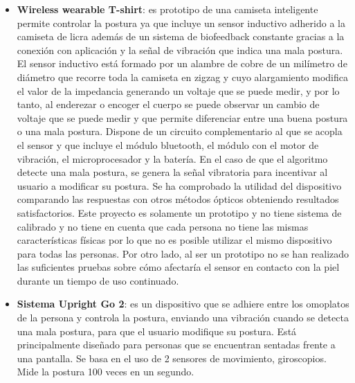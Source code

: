 \begin{itemize}
    \item \textbf{Wireless wearable T-shirt}\cite{wirelessT-shirt}: es prototipo de una camiseta inteligente permite controlar la postura ya que incluye un sensor inductivo adherido a la camiseta de licra además de un sistema de biofeedback constante gracias a la conexión con aplicación y la señal de vibración que indica una mala postura. El sensor inductivo está formado por un alambre de cobre de un milímetro de diámetro que recorre toda la camiseta en zigzag y cuyo alargamiento modifica el valor de la impedancia generando un voltaje que se puede medir, y por lo tanto, al enderezar o encoger el cuerpo se puede observar un cambio de voltaje que se puede medir y que permite diferenciar entre una buena postura o una mala postura. Dispone de un circuito complementario al que se acopla el sensor y que incluye el módulo bluetooth, el módulo con el motor de vibración, el microprocesador y la batería. En el caso de que el algoritmo detecte una mala postura, se genera la señal vibratoria para incentivar al usuario a modificar su postura. Se ha comprobado la utilidad del dispositivo comparando las respuestas con otros métodos ópticos obteniendo resultados satisfactorios. Este proyecto es solamente un prototipo y no tiene sistema de calibrado y no tiene en cuenta que cada persona no tiene las mismas características físicas por lo que no es posible utilizar el mismo dispositivo para todas las personas. Por otro lado, al ser un prototipo no se han realizado las suficientes pruebas sobre cómo afectaría el sensor en contacto con la piel durante un tiempo de uso continuado.

    \item \textbf{Sistema Upright Go 2}\cite{UprightGo1,UprightGo2,UprightGo3,UprightGo4,UprightGo5,UprightGo6}: es un dispositivo que se adhiere entre los omoplatos de la persona y controla la postura, enviando una vibración cuando se detecta una mala postura, para que el usuario modifique su postura. Está principalmente diseñado para personas que se encuentran sentadas frente a una pantalla. Se basa en el uso de 2 sensores de movimiento, giroscopios. Mide la postura 100 veces en un segundo.


\end{itemize}

